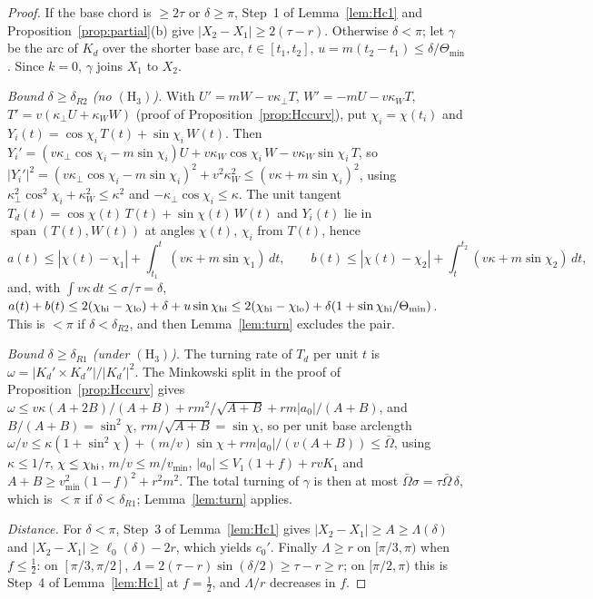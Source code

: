 \begin{proof}
If the base chord is $\ge2\tau$ or $\delta\ge\pi$, Step~1 of Lemma~\ref{lem:Hc1} and
Proposition~\ref{prop:partial}(b) give $|X_2-X_1|\ge2(\tau-r)$. Otherwise $\delta<\pi$; let $\gamma$ be the arc of
$K_d$ over the shorter base arc, $t\in[t_1,t_2]$, $u=m(t_2-t_1)\le\delta/\Theta_{\min}$. Since $k=0$, $\gamma$ joins
$X_1$ to $X_2$.

\emph{Bound $\delta\ge\delta_{R2}$ (no $(\mathrm H_3)$).} With $U'=mW-v\kappa_\perp T$, $W'=-mU-v\kappa_WT$,
$T'=v(\kappa_\perp U+\kappa_WW)$ (proof of Proposition~\ref{prop:Hccurv}), put $\chi_i=\chi(t_i)$ and
$Y_i(t)=\cos\chi_i\,T(t)+\sin\chi_i\,W(t)$. Then $Y_i'=(v\kappa_\perp\cos\chi_i-m\sin\chi_i)U+v\kappa_W\cos\chi_i\,W-v\kappa_W\sin\chi_i\,T$, so
$|Y_i'|^2=(v\kappa_\perp\cos\chi_i-m\sin\chi_i)^2+v^2\kappa_W^2\le(v\kappa+m\sin\chi_i)^2$, using
$\kappa_\perp^2\cos^2\chi_i+\kappa_W^2\le\kappa^2$ and $-\kappa_\perp\cos\chi_i\le\kappa$. The unit tangent
$T_d(t)=\cos\chi(t)\,T(t)+\sin\chi(t)\,W(t)$ and $Y_i(t)$ lie in $\operatorname{span}(T(t),W(t))$ at angles
$\chi(t)$, $\chi_i$ from $T(t)$, hence
\[
a(t)\le|\chi(t)-\chi_1|+\int_{t_1}^{t}(v\kappa+m\sin\chi_1)\,dt,\qquad
b(t)\le|\chi(t)-\chi_2|+\int_{t}^{t_2}(v\kappa+m\sin\chi_2)\,dt,
\]
and, with $\int v\kappa\,dt\le\sigma/\tau=\delta$, $a(t)+b(t)\le2(\chi_{\rm hi}-\chi_{\rm lo})+\delta+u\sin\chi_{\rm hi}
\le2(\chi_{\rm hi}-\chi_{\rm lo})+\delta(1+\sin\chi_{\rm hi}/\Theta_{\min})$. This is $<\pi$ if $\delta<\delta_{R2}$,
and then Lemma~\ref{lem:turn} excludes the pair.

\emph{Bound $\delta\ge\delta_{R1}$ (under $(\mathrm H_3)$).} The turning rate of $T_d$ per unit $t$ is
$\omega=|K_d'\times K_d''|/|K_d'|^2$. The Minkowski split in the proof of Proposition~\ref{prop:Hccurv} gives
$\omega\le v\kappa(A+2B)/(A+B)+rm^2/\sqrt{A+B}+rm|a_0|/(A+B)$, and $B/(A+B)=\sin^2\chi$, $rm/\sqrt{A+B}=\sin\chi$,
so per unit base arclength $\omega/v\le\kappa(1+\sin^2\chi)+(m/v)\sin\chi+rm|a_0|/(v(A+B))\le\bar\Omega$, using
$\kappa\le1/\tau$, $\chi\le\chi_{\rm hi}$, $m/v\le m/v_{\min}$, $|a_0|\le V_1(1+f)+rvK_1$ and
$A+B\ge v_{\min}^2(1-f)^2+r^2m^2$. The total turning of $\gamma$ is then at most $\bar\Omega\sigma=\tau\bar\Omega\,\delta$,
which is $<\pi$ if $\delta<\delta_{R1}$; Lemma~\ref{lem:turn} applies.

\emph{Distance.} For $\delta<\pi$, Step~3 of Lemma~\ref{lem:Hc1} gives $|X_2-X_1|\ge A\ge\Lambda(\delta)$ and
$|X_2-X_1|\ge\ell_0(\delta)-2r$, which yields $c_0'$. Finally $\Lambda\ge r$ on $[\pi/3,\pi)$ when $f\le\frac12$:
on $[\pi/3,\pi/2]$, $\Lambda=2(\tau-r)\sin(\delta/2)\ge\tau-r\ge r$; on $[\pi/2,\pi)$ this is Step~4 of
Lemma~\ref{lem:Hc1} at $f=\frac12$, and $\Lambda/r$ decreases in $f$.
\end{proof}

